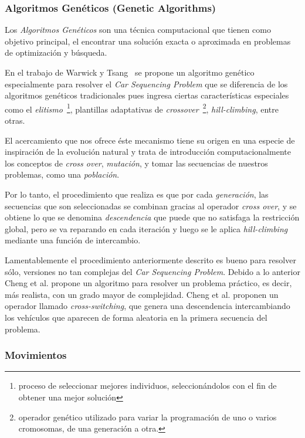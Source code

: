 \subsubsection{Algoritmos Genéticos (Genetic Algorithms)}
Los \emph{Algoritmos Genéticos} son una técnica computacional que tienen como objetivo principal,
el encontrar una solución exacta o aproximada en problemas de optimización y búsqueda.

En el trabajo de Warwick y Tsang~\cite{WT95} se propone un algoritmo genético especialmente
para resolver el \emph{Car Sequencing Problem} que se diferencia de los algoritmos genéticos
tradicionales pues ingresa ciertas características especiales como el \emph{elitismo}~\footnote{
proceso de seleccionar mejores individuos, seleccionándolos con el fin de obtener una mejor solución
}, plantillas adaptativas de \emph{crossover}~\footnote{
operador genético utilizado para variar la programación de uno o varios cromosomas, de una generación  a otra.
}, \emph{hill-climbing}, entre otras.

El acercamiento que nos ofrece éste mecanismo tiene su origen en una especie de inspiración
de la evolución natural y trata de introducción computacionalmente los conceptos de \emph{cross over},
\emph{mutación}, y tomar las secuencias de nuestros problemas, como una \emph{población}.

Por lo tanto, el procedimiento que realiza es que por cada \emph{generación}, las secuencias
que son seleccionadas se combinan gracias al operador \emph{cross over}, y se obtiene lo
que se denomina \emph{descendencia} que puede que no satisfaga la restricción global,
pero se va reparando en cada iteración y luego se le aplica \emph{hill-climbing} mediante
una función de intercambio.

Lamentablemente el procedimiento anteriormente descrito es bueno para resolver sólo,
versiones no tan complejas del \emph{Car Sequencing Problem}.
Debido a lo anterior Cheng et al. \cite{CLP+99} propone un algoritmo para resolver un
problema práctico, es decir, más realista, con un grado mayor de complejidad.
Cheng et al. \cite{CLP+99} proponen un operador llamado \emph{cross-switching},
que genera una descendencia intercambiando los vehículos que aparecen de forma aleatoria
en la primera secuencia del problema.

\subsubsection{Movimientos}

